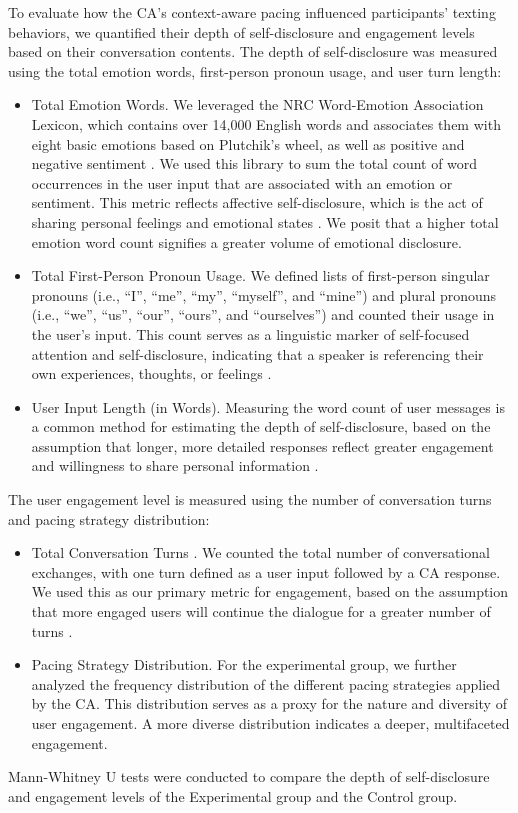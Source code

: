 To evaluate how the CA's context-aware pacing influenced participants' texting behaviors, we quantified their depth of self-disclosure and engagement levels based on their conversation contents. The depth of self-disclosure was measured using the total emotion words, first-person pronoun usage, and user turn length:
    \begin{itemize}
        \item Total Emotion Words. We leveraged the NRC Word-Emotion Association Lexicon, which contains over 14,000 English words and associates them with eight basic emotions based on Plutchik's wheel, as well as positive and negative sentiment \cite{perrie2013using}. We used this library to sum the total count of word occurrences in the user input that are associated with an emotion or sentiment. This metric reflects affective self-disclosure, which is the act of sharing personal feelings and emotional states \cite{Studer2025The,Liu2022The, reuel-etal-2022-measuring}. We posit that a higher total emotion word count signifies a greater volume of emotional disclosure.
        \item Total First-Person Pronoun Usage. We defined lists of first-person singular pronouns (i.e., ``I'', ``me'', ``my'', ``myself'', and ``mine'') and plural pronouns (i.e., ``we'', ``us'', ``our'', ``ours'', and ``ourselves'') and counted their usage in the user's input. This count serves as a linguistic marker of self-focused attention and self-disclosure, indicating that a speaker is referencing their own experiences, thoughts, or feelings \cite{Brockmeyer2015Me, reuel-etal-2022-measuring}.
        \item User Input Length (in Words). Measuring the word count of user messages is a common method for estimating the depth of self-disclosure, based on the assumption that longer, more detailed responses reflect greater engagement and willingness to share personal information \cite{Barak2007Degree, Lee2022Online, Pan2018What}.
    \end{itemize}
The user engagement level is measured using the number of conversation turns and pacing strategy distribution:
\begin{itemize}
    \item Total Conversation Turns \cite{shum2018eliza}. We counted the total number of conversational exchanges, with one turn defined as a user input followed by a CA response. We used this as our primary metric for engagement, based on the assumption that more engaged users will continue the dialogue for a greater number of turns \cite{Jiang2023Weakly, Zhou2018The, Venkatesh2018On}.
    \item Pacing Strategy Distribution. For the experimental group, we further analyzed the frequency distribution of the different pacing strategies applied by the CA. This distribution serves as a proxy for the nature and diversity of user engagement. A more diverse distribution indicates a deeper, multifaceted engagement.
\end{itemize}
Mann-Whitney U tests were conducted to compare the depth of self-disclosure and engagement levels of the Experimental group and the Control group.

